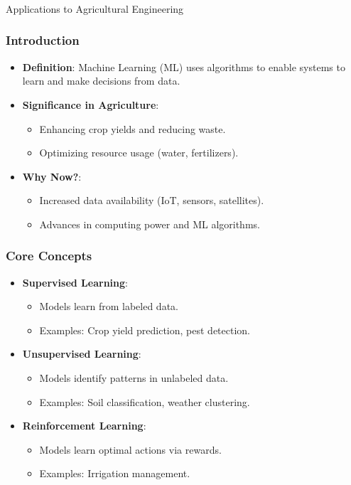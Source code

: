 \begin{frame}[fragile]\frametitle{}
\begin{center}
{\Large Applications to Agricultural Engineering}
\end{center}
\end{frame}

\begin{frame}[fragile]\frametitle{Introduction}
  \begin{itemize}
    \item \textbf{Definition}: Machine Learning (ML) uses algorithms to enable systems to learn and make decisions from data.
    \item \textbf{Significance in Agriculture}:
      \begin{itemize}
        \item Enhancing crop yields and reducing waste.
        \item Optimizing resource usage (water, fertilizers).
      \end{itemize}
    \item \textbf{Why Now?}:
      \begin{itemize}
        \item Increased data availability (IoT, sensors, satellites).
        \item Advances in computing power and ML algorithms.
      \end{itemize}
  \end{itemize}
\end{frame}

\begin{frame}[fragile]\frametitle{Core Concepts}
  \begin{itemize}
    \item \textbf{Supervised Learning}:
      \begin{itemize}
        \item Models learn from labeled data.
        \item Examples: Crop yield prediction, pest detection.
      \end{itemize}
    \item \textbf{Unsupervised Learning}:
      \begin{itemize}
        \item Models identify patterns in unlabeled data.
        \item Examples: Soil classification, weather clustering.
      \end{itemize}
    \item \textbf{Reinforcement Learning}:
      \begin{itemize}
        \item Models learn optimal actions via rewards.
        \item Examples: Irrigation management.
      \end{itemize}
  \end{itemize}
\end{frame}


